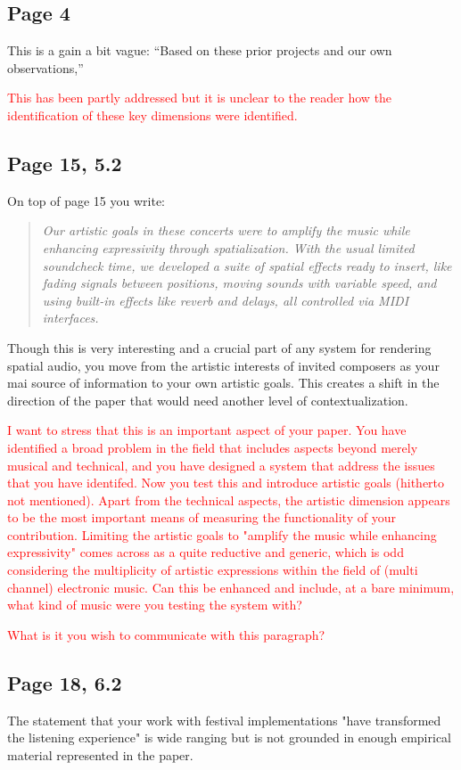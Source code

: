 \documentclass[11pt]{article}
\begin{document}
\subsection*{Page 4}
\label{sec:orgdfe080a}
This is a gain a bit vague: ``Based on these prior projects and our own observations,''

\textcolor{red}{This has been partly addressed but it is unclear to the reader how the identification of these key dimensions were identified.}
\subsection*{Page 15, 5.2}
\label{sec:orgcaefc19}
On top of page 15 you write:
\begin{quote}
\emph{Our artistic goals in these concerts were to amplify the music while enhancing expressivity
through spatialization. With the usual limited soundcheck time, we developed a suite of
spatial effects ready to insert, like fading signals between positions, moving sounds with
variable speed, and using built-in effects like reverb and delays, all controlled via MIDI
interfaces.}
\end{quote}
Though this is very interesting and a crucial part of any system for rendering spatial audio, you move from the artistic interests of invited composers as your mai source of information to your own artistic goals. This creates a shift in the direction of the paper that would need another level of contextualization.

\textcolor{red}{I want to stress that this is an important aspect of your paper. You have identified a broad problem in the field that includes aspects beyond merely musical and technical, and you have designed a system that address the issues that you have identifed. Now you test this and introduce artistic goals (hitherto not mentioned). Apart from the technical aspects, the artistic dimension appears to be the most important means of measuring the functionality of your contribution. Limiting the artistic goals to "amplify the music while enhancing expressivity" comes across as a quite reductive and generic, which is odd considering the multiplicity of artistic expressions within the field of (multi channel) electronic music. Can this be enhanced and include, at a bare minimum, what kind of music were you testing the system with?}

\textcolor{red}{What is it you wish to communicate with this paragraph?}
\subsection*{Page 18, 6.2}
\label{sec:org30c8c5d}
The statement that your work with festival implementations "have transformed the listening experience" is wide ranging but is not grounded in enough empirical material represented in the paper.
\end{document}
